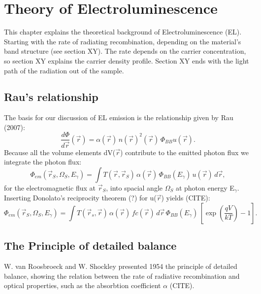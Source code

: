 \chapter{Theory of Electroluminescence}
This chapter explains the theoretical background of Electroluminescence (EL). Starting with the rate of radiating recombination, depending on the material's band structure (see section XY). The rate depends on the carrier concentration, so section XY explains the carrier density profile. Section XY ends with the light path of the radiation out of the sample.\\
\section{Rau's relationship}
The basis for our discussion of EL emission is the relationship given by Rau (2007):
\begin{equation}
	\frac{d\Phi}{d\vec{r}}(\vec{r}) = \alpha(\vec{r})\, n(\vec{r})^2(\vec{r})\, \Phi_{BB} u(\vec{r}). 
\end{equation}
Because all the volume elements dV($\vec{r}$) contribute to the emitted photon flux we integrate the photon flux:
\begin{equation}
	\Phi_{em}(\vec{r}_S, \Omega_S, E_\gamma) = \int T(\vec{r}, \vec{r}_S)\, \alpha(\vec{r})\,\Phi_{BB}(E_\gamma)\,u(\vec{r})\, d\vec{r},
\end{equation}
for the electromagnetic flux at $\vec{r}_S$, into spacial angle $\Omega_S$ at photon energy E$_\gamma$. Inserting Donolato's reciprocity theorem (?) for u($\vec{r}$) yields (CITE):
\begin{equation}
	\Phi_{em} (\vec{r}_S, \Omega_S, E_\gamma) = \int T(\vec{r}_s, \vec{r})\,\alpha(\vec{r})\,fc(\vec{r})\,d\vec{r}\,\Phi_{BB}(E_\gamma)\,\left[\exp\left(\frac{qV}{kT}\right)-1\right].
\end{equation}

\section{The Principle of detailed balance}
W. van Roosbroeck and W. Shockley presented 1954 the principle of detailed balance, showing the relation between the rate of radiative recombination and optical properties, such as the absorbtion coefficient $\alpha$ (CITE).
